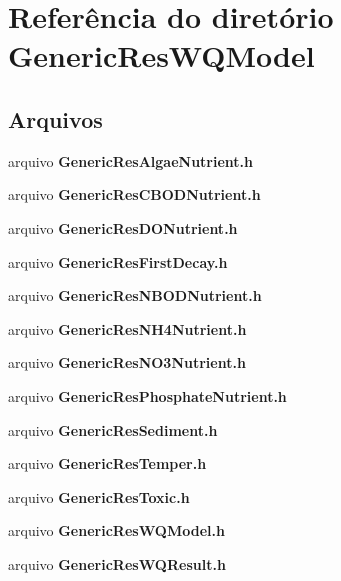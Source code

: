 \section{Referência do diretório Generic\+Res\+W\+Q\+Model}
\label{dir_4a6d7a4024bde0a2ad5aa7168c2d1f67}
\subsection*{Arquivos}
\begin{DoxyCompactItemize}
\item 
arquivo {\bf Generic\+Res\+Algae\+Nutrient.\+h}
\item 
arquivo {\bf Generic\+Res\+C\+B\+O\+D\+Nutrient.\+h}
\item 
arquivo {\bf Generic\+Res\+D\+O\+Nutrient.\+h}
\item 
arquivo {\bf Generic\+Res\+First\+Decay.\+h}
\item 
arquivo {\bf Generic\+Res\+N\+B\+O\+D\+Nutrient.\+h}
\item 
arquivo {\bf Generic\+Res\+N\+H4\+Nutrient.\+h}
\item 
arquivo {\bf Generic\+Res\+N\+O3\+Nutrient.\+h}
\item 
arquivo {\bf Generic\+Res\+Phosphate\+Nutrient.\+h}
\item 
arquivo {\bf Generic\+Res\+Sediment.\+h}
\item 
arquivo {\bf Generic\+Res\+Temper.\+h}
\item 
arquivo {\bf Generic\+Res\+Toxic.\+h}
\item 
arquivo {\bf Generic\+Res\+W\+Q\+Model.\+h}
\item 
arquivo {\bf Generic\+Res\+W\+Q\+Result.\+h}
\end{DoxyCompactItemize}
